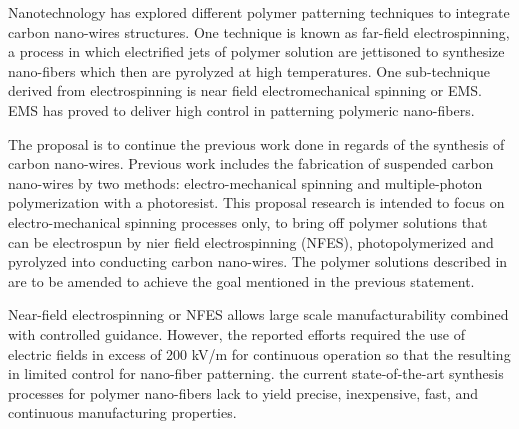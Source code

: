 Nanotechnology has explored different polymer patterning techniques to integrate carbon nano-wires structures. One technique is known as far-field electrospinning, a process in which electrified jets of polymer solution are jettisoned to synthesize nano-fibers which then are pyrolyzed at high temperatures. One sub-technique derived from electrospinning is near field electromechanical spinning or EMS. EMS has proved to deliver high control in patterning polymeric nano-fibers. \cite{Cardenas2017}

The proposal is to continue the previous work done in regards of the synthesis of carbon nano-wires. Previous work includes the fabrication of suspended carbon nano-wires by two methods: electro-mechanical spinning and multiple-photon polymerization with a photoresist. \cite{Cardenas2017} This proposal research is intended to focus on electro-mechanical spinning processes only, to bring off polymer solutions that can be electrospun by nier field electrospinning (NFES), photopolymerized and pyrolyzed into conducting carbon nano-wires. The polymer solutions described in \cite{Cardenas2017} are to be amended to achieve the goal mentioned in the previous statement.

Near-field electrospinning or NFES allows large scale manufacturability combined with controlled guidance. \cite{Madou2011} However, the reported efforts required the use of electric fields in excess of 200 kV/m for continuous operation so that the resulting in limited control for nano-fiber patterning. \cite{Madou2011} the current state-of-the-art synthesis processes for polymer nano-fibers lack to yield precise, inexpensive, fast, and continuous manufacturing properties.






